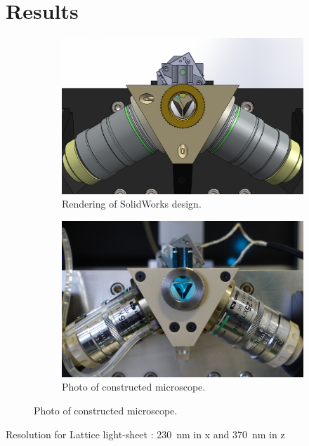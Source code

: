 \section{Results}
  \begin{figure}[htb]
    \begin{subfigure}[t]{0.5\textwidth}
      \centering
      \includegraphics[width=\textwidth]{front_solidworks_overlay}
      \caption{Rendering of SolidWorks design.}
    \end{subfigure}
    \begin{subfigure}[t]{0.5\textwidth}
      \centering
      \includegraphics[width=\textwidth]{front_photo_overlay}
      \caption{Photo of constructed microscope.}
    \end{subfigure}
    \label{fig:frontView}
  \end{figure}

  Resolution for Lattice light-sheet \cite{chen_lattice_2014}: \SI{230}{nm} in x and \SI{370}{nm} in z
  \cite{chhetri_whole-animal_2015}

